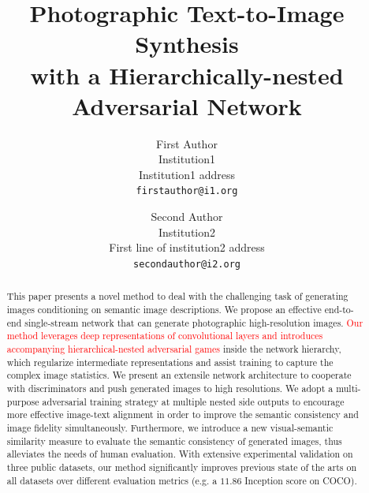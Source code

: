 \documentclass[10pt,twocolumn,letterpaper]{article}
\begin{document}
\title{Photographic Text-to-Image Synthesis \\ with a Hierarchically-nested Adversarial Network}

\author{First Author\\
Institution1\\
Institution1 address\\
{\tt\small firstauthor@i1.org}
\and
Second Author\\
Institution2\\
First line of institution2 address\\
{\tt\small secondauthor@i2.org}
}

\maketitle

\begin{abstract}
This paper presents a novel method to deal with the challenging task of generating images conditioning on semantic image descriptions. We propose an effective end-to-end single-stream network that can generate photographic high-resolution images. \textcolor{red}{Our method leverages deep representations of convolutional layers and introduces accompanying hierarchical-nested adversarial games} inside the network hierarchy, which regularize intermediate representations and assist training to capture the complex image statistics. We present an extensile network architecture to cooperate with discriminators and push generated images to high resolutions. 
We adopt a multi-purpose adversarial training strategy at multiple nested side outputs to encourage more effective image-text alignment in order to improve the semantic consistency and image fidelity simultaneously. Furthermore, we introduce a new visual-semantic similarity measure to evaluate the semantic consistency of generated images, thus alleviates the needs of human evaluation. 
With extensive experimental validation on three public datasets, our method significantly improves previous state of the arts on all datasets over different evaluation metrics (e.g. a ${11.86}$ Inception score on COCO). 
\end{abstract}
\end{document}
